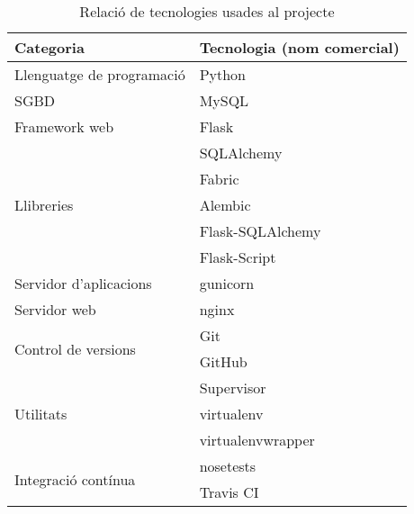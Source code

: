 \begin{table}[h!]
 	\begin{center}
 		\begin{tabularx}{\textwidth}{|l|X|}
  			\hline
 			\bfseries Categoria & \bfseries Tecnologia (nom comercial) \\ \hline
			Llenguatge de programació &  Python \\ \hline
			\ac{SGBD} & MySQL \\ \hline
			Framework web & Flask\\ \hline
			\multirow{5}{*}{Llibreries} & SQLAlchemy  \\
 & Fabric \\
 & Alembic \\
 & Flask-SQLAlchemy \\
 & Flask-Script\\ \hline
 Servidor d'aplicacions & gunicorn \\ \hline
 Servidor web & nginx \\ \hline
\multirow{2}{*}{Control de versions} & Git \\ & GitHub \\ \hline
\multirow{3}{*}{Utilitats} & Supervisor \\ & virtualenv \\ & virtualenvwrapper\\ \hline
\multirow{2}{*}{Integració contínua} & nosetests \\ & Travis CI \\ \hline
		\end{tabularx}
	\end{center}
	\label{table:tecnologies}
	\caption{Relació de tecnologies usades al projecte} 
\end{table}